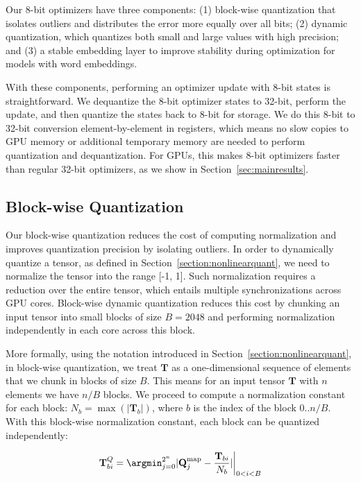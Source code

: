 Our 8-bit optimizers have three components: (1) block-wise quantization that isolates outliers and distributes the error more equally over all bits; (2) dynamic quantization, which quantizes both small and large values with high precision; and (3) a stable embedding layer to improve stability during optimization for models with word embeddings.

With these components, performing an optimizer update with 8-bit states is straightforward. We dequantize the 8-bit optimizer states to 32-bit, perform the update, and then quantize the states back to 8-bit for storage. We do this 8-bit to 32-bit conversion element-by-element in registers, which means no slow copies to GPU memory or additional temporary memory are needed to perform quantization and dequantization. For GPUs, this makes 8-bit optimizers faster than regular 32-bit optimizers, as we show in Section~\ref{sec:mainresults}.

\subsection{Block-wise Quantization}

Our block-wise quantization reduces the cost of computing normalization and improves quantization precision by isolating outliers. In order to dynamically quantize a tensor, as defined in Section~\ref{section:nonlinearquant}, we need to normalize the tensor into the range [-1, 1]. Such normalization requires a reduction over the entire tensor, which entails multiple synchronizations across GPU cores. Block-wise dynamic quantization reduces this cost by chunking an input tensor into small blocks of size $B=2048$ and performing normalization independently in each core across this block.

More formally, using the notation introduced in Section~\ref{section:nonlinearquant}, in block-wise quantization, we treat $\mathbf{T}$ as a one-dimensional sequence of elements that we chunk in blocks of size $B$. This means for an input tensor $\mathbf{T}$ with $n$ elements we have $n/B$ blocks. We proceed to compute a normalization constant for each block: $N_b = \max(|\mathbf{T}_b|)$, where $b$ is the index of the block $0..n/B$. With this block-wise normalization constant, each block can be quantized independently:

\begin{equation}
    \mathbf{T}_{bi}^Q = \argmin_{j=0}^{2^n} |\mathbf{Q}^{\text{map}}_j - \frac{\mathbf{T}_{bi}}{N_b}|{\bigg\rvert}_{0<i<B}
\end{equation}

